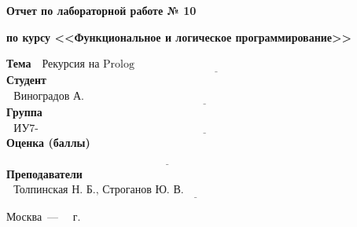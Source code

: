 \begin{titlepage}
	
	\begin{center}
		\Large\textbf{Отчет по лабораторной работе № 10}
		
		\Large\textbf{по курсу <<Функциональное и логическое программирование>>}
		
		\textbf{\newline}		
	\end{center}
	
	\noindent\textbf{Тема} $\underline{\text{~~Рекурсия на Prolog~~~~~~~~~~~~~~~~~~~~~~~~~~~~~~~~~~~~~~~~~~~~~~~~~~~~~~~~~~~~~~~~~~~~~~~~}}$\newline\newline
	\noindent\textbf{Студент} $\underline{\text{~~Виноградов А. О.~~~~~~~~~~~~~~~~~~~~~~~~~~~~~~~~~~~~~~~~~~~~~~~~~~~~~~~~~~~~~~~~~~~~~~~~~~~~~~~~~~~~~~}}$\newline\newline
	\noindent\textbf{Группа} $\underline{\text{~~ИУ7-66Б~~~~~~~~~~~~~~~~~~~~~~~~~~~~~~~~~~~~~~~~~~~~~~~~~~~~~~~~~~~~~~~~~~~~~~~~~~~~~~~~~~~~~~~~~~~~~~~~~~~~}}$\newline\newline
	\noindent\textbf{Оценка (баллы)} $\underline{\textbf{~~~~~~~~~~~~~~~~~~~~~~~~~~~~~~~~~~~~~~~~~~~~~~~~~~~~~~~~~~~~~~~~~~~~~~~~~~~~~~~~~~~~~~~~}}$\newline\newline
	\noindent\textbf{Преподаватели} $\underline{\text{~~Толпинская Н. Б., Строганов Ю. В.~~~~~~~~~~~~~~~~~~~~~~~~~~~~~~~~~~~~~~~~~~~~~~~~~~~~~~~}}$\newline
	
	\begin{center}
		\vfill
		Москва~---~\the\year
		~г.
	\end{center}
	\restoregeometry
	
\end{titlepage}